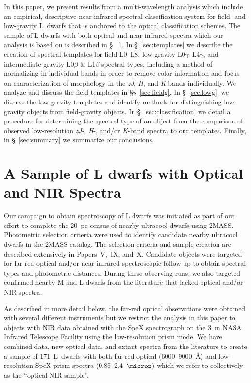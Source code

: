\documentclass[modern]{aastex61}
\newcommand{\sample}{171}
\begin{document}
In this paper, we present results from a multi-wavelength analysis which include an empirical, descriptive near-infrared spectral classification system for field- and low-gravity L~dwarfs that is anchored to the optical classification schemes.
The sample of L dwarfs with both optical and near-infrared spectra which our analysis is based on is described in \S~ \ref{sec:sample}.
In \S~\ref{sec:templates} we describe the creation of spectral templates for field L0--L8, low-gravity L0$\gamma$--L4$\gamma$, and intermediate-gravity L0$\beta$ \& L1$\beta$ spectral types, including a method of normalizing in individual bands in order to remove color information and focus on characterization of morphology in the \emph{zJ}, \emph{H}, and \emph{K} bands individually.
We analyze and discuss the field templates in \S\S~\ref{sec:fieldg}.
In \S~\ref{sec:lowg}, we discuss the low-gravity templates and identify methods for distinguishing low-gravity objects from field-gravity objects.
In \S~\ref{sec:classification} we detail a procedure for determining the spectral type of an object from the comparison of observed low-resolution \emph{zJ}-, \emph{H}-, and/or \emph{K}-band spectra to our templates.
Finally, in \S~\ref{sec:summary} we summarize our conclusions.

\section{A Sample of L dwarfs with Optical and NIR Spectra}
\label{sec:sample}

Our campaign to obtain spectroscopy of L dwarfs was initiated as part of our effort to complete the 20~pc census of nearby ultracool dwarfs using 2MASS.
Photometric selection criteria were used to identify candidate nearby ultracool dwarfs in the 2MASS catalog.
The selection criteria and sample creation are described extensively in Papers~V,~IX, and~X.
Candidate objects were targeted for far-red optical and/or near-infrared spectroscopic follow-up to obtain spectral types and photometric distances.
During these observing runs, we also targeted confirmed nearby M and L dwarfs from the literature that lacked optical and/or NIR spectra.

As described in more detail below, the far-red optical observations were obtained with several different instruments but we restrict the analysis in this paper to objects with NIR data obtained with the SpeX spectrograph \citep{Spex} on the 3~m NASA Infrared Telescope Facility using the low-resolution prism mode.
We have combined  data, new optical data, and extant spectra from the literature to create a sample of \sample~L~dwarfs with both far-red optical (6000--9000~\AA) and low-resolution SpeX prism spectra (0.85--2.4~$\micron$) which we refer to collectively as the ``optical-NIR sample''.
\end{document}
